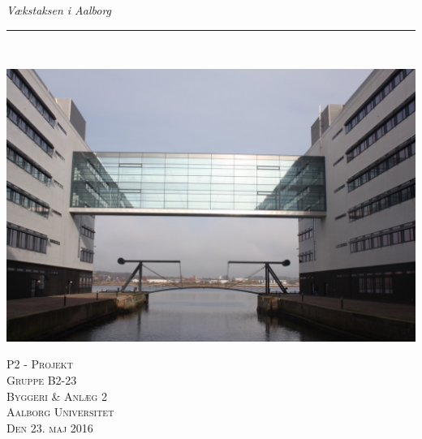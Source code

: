\thispagestyle{empty}
\begin{flushright}
\vspace{3cm}

\phantom{hul}

\phantom{hul}

\phantom{hul}

\textsl{\Huge Vækstaksen i Aalborg} \\ \vspace{1cm}

\rule{13cm}{3mm} \\ \vspace{1.5cm}
\vspace{1cm}

\includegraphics[width=1\textwidth]{billeder/KMDgangbro.jpg}

\vspace{2cm} 
\textsc{\Large P2 - Projekt \\
Gruppe B2-23 \\
Byggeri \& Anlæg 2\\
Aalborg Universitet\\
Den 23. maj 2016\\}
\end{flushright}
